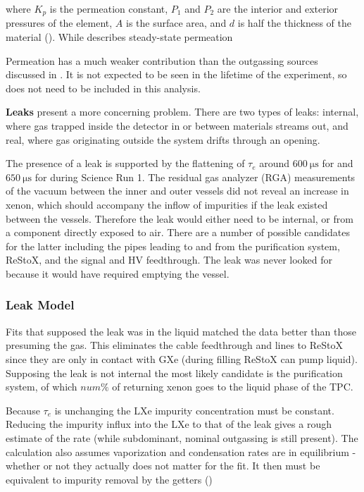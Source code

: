 \noindent where $K_p$ is the permeation constant, $P_1$ and $P_2$ are the interior and exterior pressures of the element, $A$ is the
surface area, and
$d$ is half the thickness of the material ().  While 
describes steady-state permeation 

Permeation has a much weaker contribution than the outgassing sources discussed in
.  It is not expected to be seen in the lifetime of the
experiment, so does not need to be included in this analysis.

\textbf{Leaks} present a more concerning problem.  There are two types of leaks: internal, where gas trapped inside the detector
in or between materials streams out, and real, where gas originating outside the system drifts through an opening.

The presence of a leak is supported by the flattening of $\tau_e$ around $600\ \mathrm{\mu s}$ for \alphadecays and
$650\ \mathrm{\mu s}$ for \metakr during Science Run 1.  The residual gas analyzer (RGA) measurements of the vacuum between the inner and
outer vessels did not reveal an increase in xenon, which should accompany the inflow of impurities if the leak existed
between the vessels.  Therefore the
leak would either need to be internal, or from a component directly exposed to air.  There are a number of possible candidates for the
latter including the pipes leading to and from the purification system, ReStoX, and the signal and HV feedthrough.  The leak was never
looked for because it would have required emptying the vessel.



\subsubsection{Leak Model}
\label{subsubsec:electron_lifetime_model_outgassing_leak_model}
Fits that supposed the leak was in the liquid matched the data better than those presuming the gas.  This eliminates the cable feedthrough
and lines to ReStoX since they are only in contact with GXe (during filling ReStoX can pump liquid).  Supposing the leak is
not internal the most likely candidate is the purification system, of which $num\%$ of returning xenon goes to the liquid phase of the
TPC.

Because $\tau_e$ is unchanging the LXe impurity concentration must be constant.  Reducing the impurity influx into the LXe to that of the
leak
gives a rough estimate of the rate (while subdominant, nominal outgassing is still present).  The calculation also
assumes vaporization and condensation rates are in equilibrium - whether or not they actually does not matter for the fit.  It then must
be equivalent to impurity removal by the getters ()

